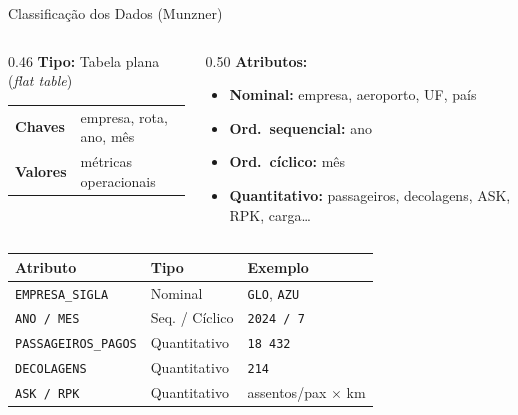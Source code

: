 \documentclass[aspectratio=169]{beamer}
\begin{document}
\begin{frame}[t]{Classificação dos Dados (Munzner)}
  \begin{columns}[T]
    \begin{column}{0.46\textwidth}
      \textbf{Tipo:} Tabela plana (\textit{flat table})\\[5pt]
      \begin{tabular}{@{}ll@{}}
        \textbf{Chaves}  & empresa, rota, ano, mês \\[3pt]
        \textbf{Valores} & métricas operacionais \\
      \end{tabular}
    \end{column}
    \begin{column}{0.50\textwidth}
      \textbf{Atributos:}
      \begin{itemize}\setlength{\itemsep}{3pt}
        \item \textbf{Nominal:} empresa, aeroporto, UF, país
        \item \textbf{Ord.\ sequencial:} ano
        \item \textbf{Ord.\ cíclico:} mês
        \item \textbf{Quantitativo:} passageiros, decolagens, ASK, RPK, carga\ldots
      \end{itemize}
    \end{column}
  \end{columns}
  \smallskip
  \footnotesize
  \begin{tabular}{@{}lll@{}}
    \toprule
    \textbf{Atributo} & \textbf{Tipo} & \textbf{Exemplo} \\
    \midrule
    \rowcolor{lightgray}
    \texttt{EMPRESA\_SIGLA}      & Nominal          & \texttt{GLO}, \texttt{AZU} \\
    \texttt{ANO / MES}           & Seq. / Cíclico   & \texttt{2024 / 7} \\
    \rowcolor{lightgray}
    \texttt{PASSAGEIROS\_PAGOS}  & Quantitativo     & \texttt{18\,432} \\
    \texttt{DECOLAGENS}          & Quantitativo     & \texttt{214} \\
    \rowcolor{lightgray}
    \texttt{ASK / RPK}           & Quantitativo     & assentos/pax $\times$ km \\
    \bottomrule
  \end{tabular}
\end{frame}

\end{document}
